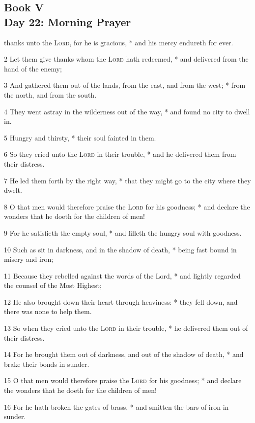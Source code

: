 \subsection{Book V\\Day 22: Morning Prayer}
 thanks unto the {\textsc{Lord}}, for he is gracious, * and his mercy endureth for ever.\par
2 Let them give thanks whom the {\textsc{Lord}} hath redeemed, * and delivered from the hand of the enemy;\par
3 And gathered them out of the lands, from the east, and from the west; * from the north, and from the south.\par
4 They went astray in the wilderness out of the way, * and found no city to dwell in.\par
5 Hungry and thirsty, * their soul fainted in them.\par
6 So they cried unto the {\textsc{Lord}} in their trouble, * and he delivered them from their distress.\par
7 He led them forth by the right way, * that they might go to the city where they dwelt.\par
8 O that men would therefore praise the {\textsc{Lord}} for his goodness; * and declare the wonders that he doeth for the children of men!\par
9 For he satisfieth the empty soul, * and filleth the hungry soul with goodness.\par
10 Such as sit in darkness, and in the shadow of death, * being fast bound in misery and iron;\par
11 Because they rebelled against the words of the Lord, * and lightly regarded the counsel of the Most Highest;\par
12 He also brought down their heart through heaviness: * they fell down, and there was none to help them.\par
13 So when they cried unto the {\textsc{Lord}} in their trouble, * he delivered them out of their distress.\par
14 For he brought them out of darkness, and out of the shadow of death, * and brake their bonds in sunder.\par
15 O that men would therefore praise the {\textsc{Lord}} for his goodness; * and declare the wonders that he doeth for the children of men!\par
16 For he hath broken the gates of brass, * and smitten the bars of iron in sunder.\par
